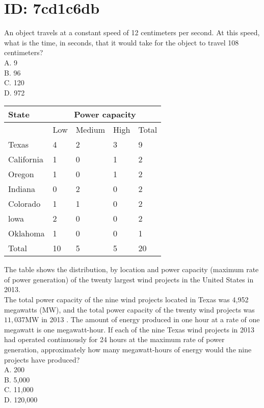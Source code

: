 \section*{ID: 7cd1c6db}
An object travels at a constant speed of 12 centimeters per second. At this speed, what is the time, in seconds, that it would take for the object to travel 108 centimeters?\\
A. 9\\
B. 96\\
C. 120\\
D. 972

\begin{center}
\begin{tabular}{|l|l|l|l|l|}
\hline
\multirow{2}{*}{State} & \multicolumn{4}{|c|}{Power capacity} \\
\hline
 & Low & Medium & High & Total \\
\hline
Texas & 4 & 2 & 3 & 9 \\
\hline
California & 1 & 0 & 1 & 2 \\
\hline
Oregon & 1 & 0 & 1 & 2 \\
\hline
Indiana & 0 & 2 & 0 & 2 \\
\hline
Colorado & 1 & 1 & 0 & 2 \\
\hline
lowa & 2 & 0 & 0 & 2 \\
\hline
Oklahoma & 1 & 0 & 0 & 1 \\
\hline
Total & 10 & 5 & 5 & 20 \\
\hline
\end{tabular}
\end{center}

The table shows the distribution, by location and power capacity (maximum rate of power generation) of the twenty largest wind projects in the United States in 2013.\\
The total power capacity of the nine wind projects located in Texas was 4,952 megawatts (MW), and the total power capacity of the twenty wind projects was $11,037 \mathrm{MW}$ in 2013 . The amount of energy produced in one hour at a rate of one megawatt is one megawatt-hour. If each of the nine Texas wind projects in 2013 had operated continuously for 24 hours at the maximum rate of power generation, approximately how many megawatt-hours of energy would the nine projects have produced?\\
A. 200\\
B. 5,000\\
C. 11,000\\
D. 120,000

